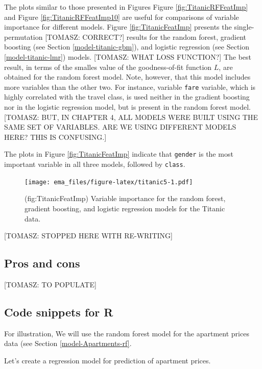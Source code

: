 \documentclass[12pt,]{krantz}
\begin{document}
The plots similar to those presented in Figures Figure \ref{fig:TitanicRFFeatImp} and Figure \ref{fig:TitanicRFFeatImp10} are useful for comparisons of variable importance for different models.
Figure \ref{fig:TitanicFeatImp} presents the single-permutation {[}TOMASZ: CORRECT?{]} results for the random forest, gradient boosting (see Section \ref{model-titanic-gbm}), and logistic regression (see Section \ref{model-titanic-lmr}) models. {[}TOMASZ: WHAT LOSS FUNCTION?{]} The best result, in terms of the smalles value of the goodness-of-fit function \(L\), are obtained for the random forest model. Note, however, that this model includes more variables than the other two. For instance, variable \texttt{fare} variable, which is highly correlated with the travel class, is used neither in the gradient boosting nor in the logistic regression model, but is present in the random forest model. {[}TOMASZ: BUT, IN CHAPTER 4, ALL MODELS WERE BUILT USING THE SAME SET OF VARIABLES. ARE WE USING DIFFERENT MODELS HERE? THIS IS CONFUSING.{]}

The plots in Figure \ref{fig:TitanicFeatImp} indicate that \texttt{gender} is the most important variable in all three models, followed by \texttt{class}.

\begin{figure}
\centering
\texttt{[image: ema\_files/figure-latex/titanic5-1.pdf]}
\caption{\label{fig:titanic5}(fig:TitanicFeatImp) Variable importance for the random forest, gradient boosting, and logistic regression models for the Titanic data.}
\end{figure}

{[}TOMASZ: STOPPED HERE WITH RE-WRITING{]}

\hypertarget{featureImportanceProsCons}{%
\subsection{Pros and cons}\label{featureImportanceProsCons}}

{[}TOMASZ: TO POPULATE{]}

\hypertarget{featureImportanceR}{%
\subsection{Code snippets for R}\label{featureImportanceR}}

For illustration, We will use the random forest model for the apartment prices data (see Section \ref{model-Apartments-rf}.

Let's create a regression model for prediction of apartment prices.
\end{document}
